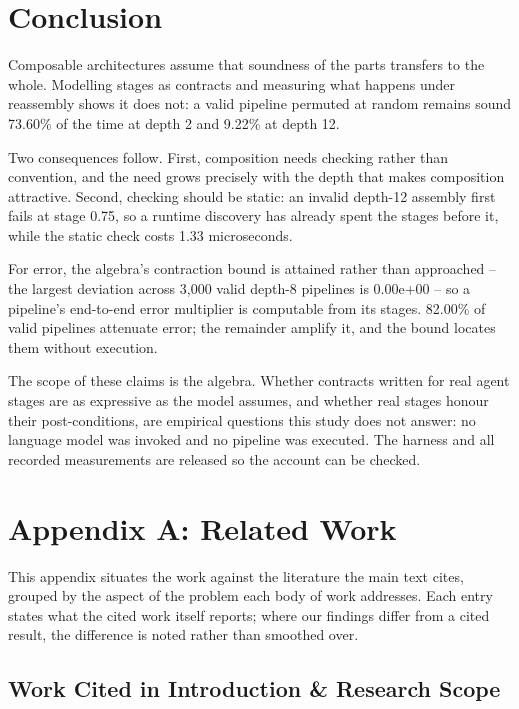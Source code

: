 \documentclass[10pt,twocolumn,letterpaper]{article}
\begin{document}
\section{Conclusion}


Composable architectures assume that soundness of the parts transfers to the whole. Modelling stages as contracts and measuring what happens under reassembly shows it does not: a valid pipeline permuted at random remains sound 73.60\% of the time at depth 2 and 9.22\% at depth 12.

Two consequences follow. First, composition needs checking rather than convention, and the need grows precisely with the depth that makes composition attractive. Second, checking should be static: an invalid depth-12 assembly first fails at stage 0.75, so a runtime discovery has already spent the stages before it, while the static check costs 1.33 microseconds.

For error, the algebra's contraction bound is attained rather than approached -- the largest deviation across 3,000 valid depth-8 pipelines is 0.00e+00 -- so a pipeline's end-to-end error multiplier is computable from its stages. 82.00\% of valid pipelines attenuate error; the remainder amplify it, and the bound locates them without execution.

The scope of these claims is the algebra. Whether contracts written for real agent stages are as expressive as the model assumes, and whether real stages honour their post-conditions, are empirical questions this study does not answer: no language model was invoked and no pipeline was executed. The harness and all recorded measurements are released so the account can be checked.






\section{Appendix A: Related Work}


This appendix situates the work against the literature the main text cites, grouped by the aspect of the problem each body of work addresses. Each entry states what the cited work itself reports; where our findings differ from a cited result, the difference is noted rather than smoothed over.


\subsection{Work Cited in Introduction \& Research Scope}
\end{document}
